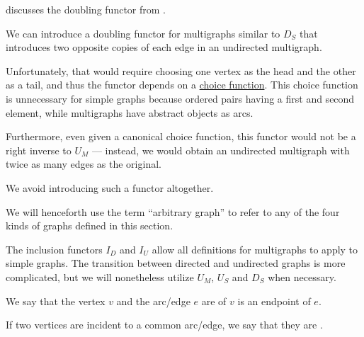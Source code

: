 \begin{comments}
  \item {} discusses the doubling functor from .
  \item We can introduce a doubling functor for multigraphs similar to \hyperref[def:graph_functors/simple_doubling]{\( D_S \)} that introduces two opposite copies of each edge in an undirected multigraph.

  Unfortunately, that would require choosing one vertex as the head and the other as a tail, and thus the functor depends on a \hyperref[def:choice_function]{choice function}. This choice function is unnecessary for simple graphs because ordered pairs having a first and second element, while multigraphs have abstract objects as arcs.

  Furthermore, even given a canonical choice function, this functor would not be a right inverse to \hyperref[def:graph_functors/multi_forgetful]{\( U_M \)} --- instead, we would obtain an undirected multigraph with twice as many edges as the original.

  We avoid introducing such a functor altogether.
\end{comments}

\begin{remark}\label{rem:arbitrary_graph}
  We will henceforth use the term \enquote{arbitrary graph} to refer to any of the four kinds of graphs defined in this section.

  The inclusion functors \hyperref[def:graph_functors/directed_inclusion]{\( I_D \)} and \hyperref[def:graph_functors/undirected_inclusion]{\( I_U \)} allow all definitions for multigraphs to apply to simple graphs. The transition between directed and undirected graphs is more complicated, but we will nonetheless utilize \hyperref[def:graph_functors/multi_forgetful]{\( U_M \)}, \hyperref[def:graph_functors/simple_forgetful]{\( U_S \)} and \hyperref[def:graph_functors/simple_doubling]{\( D_S \)} when necessary.
\end{remark}

\begin{definition}\label{def:graph_incidence}
  We say that the vertex \( v \) and the arc/edge \( e \) are  of \( v \) is an endpoint of \( e \).
\end{definition}

\begin{definition}\label{def:graph_adjacency}
  If two vertices are incident to a common arc/edge, we say that they are .
\end{definition}

